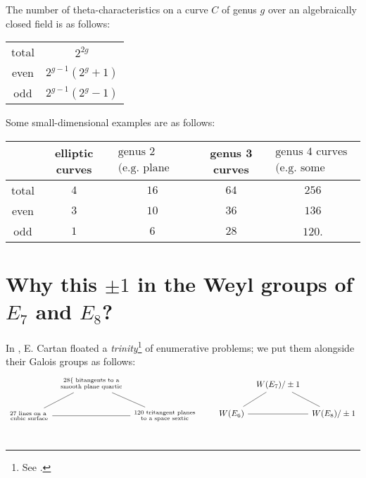 \documentclass[11pt]{amsart}
\begin{document}
\begin{proposition} The number of theta-characteristics on a curve $C$ of genus $g$ over an algebraically closed field is as follows:
\begin{center}
    \begin{tabular}{c c}
    total & $2^{2g}$ \\
    even & $2^{g-1}(2^g+1)$ \\
    odd & $2^{g-1}(2^g - 1)$
    \end{tabular}
\end{center}
Some small-dimensional examples are as follows:
\begin{center}
    \begin{tabular}{c | c c c c }
    & elliptic curves & $\substack{\text{genus 2 curves} \\ \text{(e.g. plane quartics)}}$ & genus 3 curves & $\substack{\text{genus 4 curves} \\\text{(e.g. some space sextics)}}$ \\
    \hline
    total   & $4$   & $16$  & $64$  & $256$\\
    even    & $3$   & $10$  & $36$  & $136$\\
    odd     & $1$   & $6$   & $28$  & $120$.
    \end{tabular}
\end{center}
\end{proposition}


\section{Why this $\pm1$ in the Weyl groups of $E_7$ and $E_8$?}

In \cite[p.~2]{cartanReductionSaForme1896}, E. Cartan floated a \textit{trinity}\footnote{See \cite[p.~13]{Arnold-fields2}.} of enumerative problems; we put them alongside their Galois groups as follows:
\[ \begin{tikzcd}[column sep=tiny]
     & \substack{28\{\text{ bitangents to a} \\ \text{smooth plane quartic}}\ar[dr,no head] & \\
    \substack{27\text{ lines on a }\\ \text{cubic surface}}\ar[rr,no head]\ar[ur,no head] &  & \substack{120 \text{ tritangent planes}\\ \text{to a space sextic}}\\
\end{tikzcd} \quad\quad  \begin{tikzcd}[column sep=tiny]
     & W(E_7)/\pm1\ar[dr,no head]\\
    W(E_6)\ar[ur,no head]\ar[rr,no head] & & W(E_8)/\pm 1\\
\end{tikzcd} \]
\end{document}
